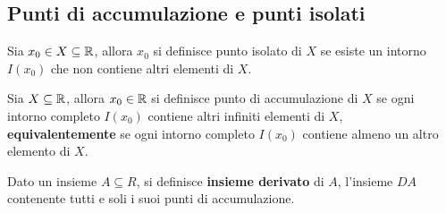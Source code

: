 \documentclass{book}     %
\begin{document}
\subsection{Punti di accumulazione e punti isolati}
\begin{boxdef}
    Sia $x_0\in X\subseteq\mathbb{R}$, allora $x_0$ si definisce punto isolato di $X$ se esiste un intorno $I(x_0)$ che non contiene altri elementi di $X$.
\end{boxdef}
\begin{boxdef}
    Sia $ X\subseteq\mathbb{R}$, allora $x_0\in \mathbb{R}$ si definisce punto di accumulazione di $X$ se ogni intorno completo $I(x_0)$ contiene altri infiniti elementi di $X$,\\
    \textbf{equivalentemente} se ogni intorno completo $I(x_0)$ contiene almeno un altro elemento di $X$.
\end{boxdef}
\begin{boxdef}
    Dato un insieme $A\subseteq R$, si definisce \textbf{insieme derivato} di $A$, l'insieme $DA$ contenente tutti e soli i suoi punti di accumulazione.
\end{boxdef}
\end{document}
